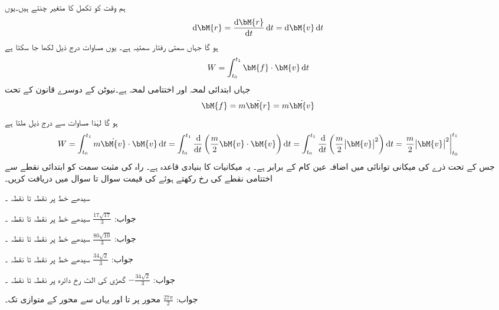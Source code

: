 ہم وقت  کو تکمل کا متغیر چنتے ہیں۔یوں
\begin{align*}
\dif \bM{r}=\frac{\dif\bM{r}}{\dif t}\dif t=\dif \bM{v}\dif t
\end{align*} 
ہو گا جہاں  سمتی رفتار سمتیہ ہے۔ یوں مساوات  درج ذیل لکھا جا سکتا ہے
\begin{align}\label{مساوات_خطی_تکمل_کام_ب}
W=\int_{t_0}^{t_1}\bM{f}\cdot \bM{v}\dif t
\end{align}
جہاں ابتدائی لمحہ  اور اختتامی لمحہ  ہے۔نیوٹن کے دوسرے قانون کے تحت 
\begin{align}
\bM{f}=m\ddot{\bM{r}}=m\dot{\bM{v}}
\end{align}
ہو گا لہٰذا مساوات  سے درج ذیل ملتا ہے
\begin{align*}
W=\int_{t_0}^{t_1}m\dot{\bM{v}}\cdot \bM{v}\dif t=\int_{t_0}^{t_1}\frac{\dif}{\dif t}\left(\frac{m}{2}\bM{v}\cdot \bM{v}\right)\dif t=\int_{t_0}^{t_1}\frac{\dif}{\dif t}\left(\frac{m}{2}\abs{\bM{v}}^2\right)\dif t=\left.\frac{m}{2}\abs{\bM{v}}^2\right |_{t_0}^{t_1}
\end{align*}
جس  کے تحت ذرے کی میکانی توانائی میں اضافہ عین  کام کے برابر ہے۔ یہ میکانیات کا بنیادی قاعدہ ہے۔ 
راہ کی مثبت سمت کو ابتدائی نقطے سے اختتامی نقطے کی رخ رکھتے ہوئے  کی قیمت سوال  تا سوال  میں دریافت کریں۔

سیدھے خط  پر نقطہ  تا نقطہ ۔

جواب:\quad
$\tfrac{17\sqrt{17}}{3}$
سیدھے خط  پر نقطہ  تا نقطہ ۔

جواب:\quad
$\tfrac{80\sqrt{10}}{3}$
سیدھے خط  پر نقطہ  تا نقطہ ۔

جواب:\quad
$\tfrac{34\sqrt{2}}{3}$
سیدھے خط  پر نقطہ  تا نقطہ ۔

جواب:\quad
$-\tfrac{34\sqrt{2}}{3}$
گھڑی کی الٹ رخ دائرہ  پر نقطہ  تا نقطہ ۔

جواب:\quad
$\tfrac{27\pi}{2}$
 محور پر  تا  اور یہاں سے  محور کے متوازی  تک۔

